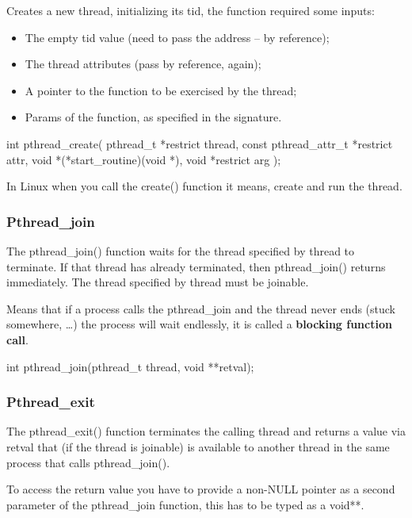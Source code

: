 Creates a new thread, initializing its tid, the function required some inputs:
\begin{itemize}
    \item The empty tid value (need to pass the address – by reference);
    \item The thread attributes (pass by reference, again);
    \item A pointer to the function to be exercised by the thread;
    \item Params of the function, as specified in the signature.
\end{itemize}

\begin{codeInC}
int pthread_create( pthread_t *restrict thread,
                    const pthread_attr_t *restrict attr,
                    void *(*start_routine)(void *),
                    void *restrict arg );
\end{codeInC}

In Linux when you call the create() function it means, create and run the thread.


\subsubsection{Pthread\_join}

The pthread\_join() function waits for the thread specified by thread to
terminate. If that thread has already terminated, then pthread\_join()
returns immediately. The thread specified by thread must be joinable.

Means that if a process calls the pthread\_join and the thread never
ends (stuck somewhere, …) the process will wait endlessly, it is called a \textbf{blocking function call}.

\begin{codeInC}
int pthread_join(pthread_t thread, void **retval);
\end{codeInC}

\subsubsection{Pthread\_exit}

The pthread\_exit() function terminates the calling thread and returns a
value via retval that (if the thread is joinable) is available to another
thread in the same process that calls pthread\_join().

To access the return value you have to provide a non-NULL pointer as
a second parameter of the pthread\_join function, this has to be typed as a void**.


